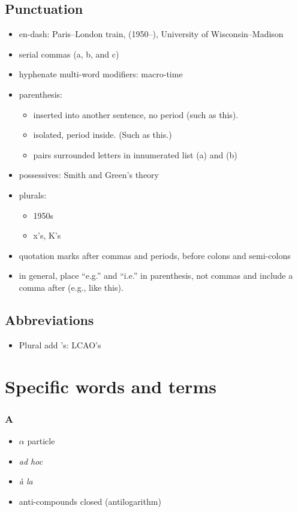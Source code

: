 \documentclass[10pt, letter]{article}
\begin{document}
\begin{multicols}{2}
\subsection{Punctuation}
\label{sec:punctuation}
\begin{itemize}
\item en-dash: Paris--London train, (1950--), University of Wisconsin--Madison
\item serial commas (a, b, and c)
\item hyphenate multi-word modifiers: macro-time
\item parenthesis:
  \begin{itemize}
  \item inserted into another sentence, no period (such as this).
  \item isolated, period inside. (Such as this.)
  \item pairs surrounded letters in innumerated list (a) and (b)
  \end{itemize}
\item possessives: Smith and Green's theory
\item plurals:
  \begin{itemize}
  \item 1950s
  \item x's, K's
  \end{itemize}
\item quotation marks after commas and periods, before colons and
  semi-colons
\item in general, place ``e.g.'' and ``i.e.'' in parenthesis, not
  commas and include a comma after (e.g., like this). 
\end{itemize}

\subsection{Abbreviations}
\label{sec:abbreviations}
\begin{itemize}
\item Plural add 's: LCAO's
\end{itemize}

\pagebreak

\section{Specific words and terms}\label{sec:words}

\subsubsection*{A}
\begin{itemize}
\item $\alpha$ particle
\item \textit{ad hoc}
\item \textit{\`{a} la}
\item anti-compounds closed (antilogarithm)
\end{itemize}


\end{multicols}
\end{document}
